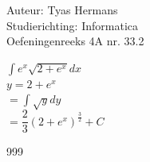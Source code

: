 \documentclass[a4paper]{article}
\newcommand{\dint}{\displaystyle\int}
\begin{document}
  
\noindent \large Auteur: Tyas Hermans \\
\noindent \large Studierichting: Informatica\\
\noindent \large Oefeningenreeks 4A nr. 33.2\\

\medskip

\normalsize

$\dint e^{x}\sqrt{2+e^{x}}dx$\\

$y=2+e^{x}$\\

$=\dint \sqrt{y} dy$\\

$= \dfrac{2}{3}\left(2+e^x\right)^{\tfrac{3}{2}}+C$\\


\begin{thebibliography}{999}
\end{thebibliography}
\end{document}
